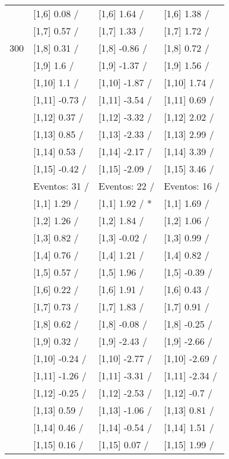 \begin{table}
\begin{tabular}[t]{llll}
 & {}[1,6] 0.08  / & {}[1,6] 1.64  / & {}[1,6] 1.38  /\\
 & {}[1,7] 0.57  / & {}[1,7] 1.33  / & {}[1,7] 1.72  /\\
300 & {}[1,8] 0.31  / & {}[1,8] -0.86  / & {}[1,8] 0.72  /\\
\addlinespace
 & {}[1,9] 1.6  / & {}[1,9] -1.37  / & {}[1,9] 1.56  /\\
 & {}[1,10] 1.1  / & {}[1,10] -1.87  / & {}[1,10] 1.74  /\\
 & {}[1,11] -0.73  / & {}[1,11] -3.54  / & {}[1,11] 0.69  /\\
 & {}[1,12] 0.37  / & {}[1,12] -3.32  / & {}[1,12] 2.02  /\\
 & {}[1,13] 0.85  / & {}[1,13] -2.33  / & {}[1,13] 2.99  /\\
\addlinespace
 & {}[1,14] 0.53  / & {}[1,14] -2.17  / & {}[1,14] 3.39  /\\
 & {}[1,15] -0.42  / & {}[1,15] -2.09  / & {}[1,15] 3.46  /\\
 & Eventos:  31 / & Eventos:  22 / & Eventos:  16 /\\
 & {}[1,1] 1.29  / & {}[1,1] 1.92  / * & {}[1,1] 1.69  /\\
 & {}[1,2] 1.26  / & {}[1,2] 1.84  / & {}[1,2] 1.06  /\\
\addlinespace
 & {}[1,3] 0.82  / & {}[1,3] -0.02  / & {}[1,3] 0.99  /\\
 & {}[1,4] 0.76  / & {}[1,4] 1.21  / & {}[1,4] 0.82  /\\
 & {}[1,5] 0.57  / & {}[1,5] 1.96  / & {}[1,5] -0.39  /\\
 & {}[1,6] 0.22  / & {}[1,6] 1.91  / & {}[1,6] 0.43  /\\
 & {}[1,7] 0.73  / & {}[1,7] 1.83  / & {}[1,7] 0.91  /\\
\addlinespace
500 & {}[1,8] 0.62  / & {}[1,8] -0.08  / & {}[1,8] -0.25  /\\
 & {}[1,9] 0.32  / & {}[1,9] -2.43  / & {}[1,9] -2.66  /\\
 & {}[1,10] -0.24  / & {}[1,10] -2.77  / & {}[1,10] -2.69  /\\
 & {}[1,11] -1.26  / & {}[1,11] -3.31  / & {}[1,11] -2.34  /\\
 & {}[1,12] -0.25  / & {}[1,12] -2.53  / & {}[1,12] -0.7  /\\
\addlinespace
 & {}[1,13] 0.59  / & {}[1,13] -1.06  / & {}[1,13] 0.81  /\\
 & {}[1,14] 0.46  / & {}[1,14] -0.54  / & {}[1,14] 1.51  /\\
 & {}[1,15] 0.16  / & {}[1,15] 0.07  / & {}[1,15] 1.99  /\\
\bottomrule
\end{tabular}
\end{table}
